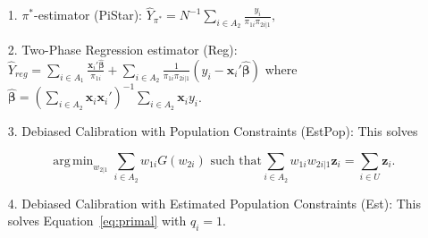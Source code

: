\documentclass[12pt]{article}
\DeclareMathOperator*{\argmin}{arg\,min}
\renewcommand{\bf}[1]{\mathbf{#1}}
\begin{document}
\begin{itemize}
  \item[1.] $\pi^*$-estimator (PiStar): $\hat Y_{\pi^*} = N^{-1} \sum_{i \in A_2}
    \frac{y_i}{\pi_{1i} \pi_{2i|1}},$
  \item[2.] Two-Phase Regression estimator (Reg): 
    $\hat Y_{reg} = \sum_{i \in A_1} \frac{\bf x_i' \widehat{\bm \beta}}{\pi_{1i}} + 
    \sum_{i \in A_2} \frac{1}{\pi_{1i}\pi_{2i|1}}(y_i - \bf x_i' \widehat{\bm \beta})$ 
    where $\widehat{\bm \beta} = 
    \left(\sum_{i \in A_2} \bf x_i \bf x_i'\right)^{-1} \sum_{i \in A_2} \bf x_i y_i$.
  \item[3.] Debiased Calibration with Population Constraints (EstPop): This 
    solves 

  \begin{equation}
    \argmin_{w_{2|1}} \sum_{i \in A_2} w_{1i} G(w_{2i}) \text{ such that}
    \sum_{i \in A_2} w_{1i} w_{2i|1} \bf z_i = \sum_{i \in U} \bf z_i.
  \end{equation}

  \item[4.] Debiased Calibration with Estimated Population Constraints (Est):
    This solves Equation~\eqref{eq:primal} with $q_i = 1$.
\end{itemize}
\end{document}
